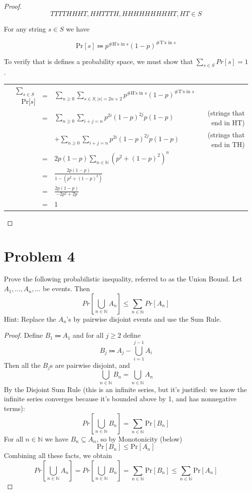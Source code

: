\documentclass[14pt]{extarticle}
\newcommand{\dps}{\displaystyle}
\begin{document}
\begin{proof}
$$
TTTTHHHT, HHTTTH, HHHHHHHHHT, HT \in S
$$

For any string $s \in S$ we have

$$
\text{Pr}[s] \Coloneqq p^{\text{\# H's in }s}(1-p)^{\text{\# T's in }s}
$$

To verify that is defines a probability space, we must show that $\sum_{s \in S}Pr[s] = 1$.

\begin{tabular}{rclr}
$\dps\sum_{s \in S}$Pr[$s$] &=& $\dps\sum_{n \geq 0} \sum_{s \in S, |s| = 2n+2} p^{\text{\# H's in }s}(1-p)^{\text{\# T's in }s}$ &\\
&=& $\dps\sum_{n \geq 0} \sum_{i+j=n} p^{2i}(1-p)^{2j}p(1-p)$ & (strings that end in HT)\\
& & $\dps + \sum_{n \geq 0} \sum_{i+j=n} p^{2i}(1-p)^{2j}p(1-p)$ & (strings that end in TH)\\
&=& $\dps 2p(1-p)\sum_{n \in \mathbb{N}}(p^2 + (1-p)^2)^n $ & \\
&=& $\dps \frac{2p(1-p)}{1 - (p^2 + (1-p)^2)}$ & \\
&=& $\dps \frac{2p(1-p)}{-2p^2+2p}$ & \\
&=& 1 & \\
\end{tabular}

\end{proof}

\section{Problem 4}
Prove the following probabilistic inequality, referred to as the Union Bound. Let $A_1, \ldots, A_n, \ldots$ be events. Then
$$
Pr\left[\bigcup_{n \in \mathbb{N}}A_n\right] \leq \sum_{n \in \mathbb{N}}Pr[A_n]
$$
Hint: Replace the $A_n$’s by pairwise disjoint events and use the Sum Rule.

\begin{proof}
Define $B_1 \Coloneqq A_1$ and for all $j \geq 2$ define
$$
B_j \Coloneqq A_j - \bigcup_{i = 1}^{j-1} A_i
$$
Then all the $B_j$s are pairwise disjoint, and
$$
\bigcup_{n \in \mathbb{N}} B_n = \bigcup_{n \in \mathbb{N}} A_n
$$
By the Disjoint Sum Rule (this is an infinite series, but it's justified: we know the infinite series converges because it's bounded above by 1, and has nonnegative terms):
$$
Pr\left[\bigcup_{n \in \mathbb{N}} B_n\right] = \sum_{n \in \mathbb{N}} \text{Pr}[B_n]
$$
For all $n \in \mathbb{N}$ we have $B_n \subseteq A_n$, so by Monotonicity (below)
$$
\text{Pr}[B_n] \leq \text{Pr}[A_n]
$$
Combining all these facts, we obtain
$$
Pr\left[\bigcup_{n \in \mathbb{N}}A_n\right] = Pr\left[\bigcup_{n \in \mathbb{N}}B_n\right] = \sum_{n \in \mathbb{N}} \text{Pr}[B_n] \leq \sum_{n \in \mathbb{N}} \text{Pr}[A_n]
$$
\end{proof}
\end{document}
